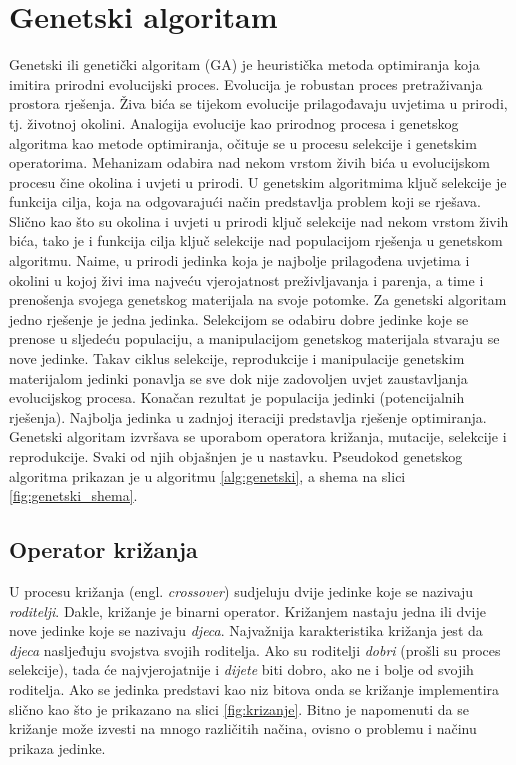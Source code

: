 \documentclass[times, utf8, zavrsni, numeric]{fer}
\begin{document}
\section{Genetski algoritam}
\label{sec:genetski}
Genetski ili genetički algoritam (GA)  je heuristička metoda optimiranja koja imitira prirodni evolucijski proces. Evolucija je robustan proces pretraživanja prostora rješenja. Živa bića se tijekom evolucije prilagođavaju uvjetima u prirodi, tj. životnoj okolini. Analogija evolucije kao prirodnog procesa i genetskog algoritma kao metode optimiranja, očituje se u procesu selekcije i genetskim operatorima. Mehanizam odabira nad nekom vrstom živih bića u evolucijskom procesu čine okolina i uvjeti u prirodi. U genetskim algoritmima ključ selekcije je funkcija cilja, koja na odgovarajući način predstavlja problem koji se rješava. Slično kao što su okolina i uvjeti u prirodi ključ selekcije nad nekom vrstom živih bića, tako je i funkcija cilja ključ selekcije nad populacijom rješenja u genetskom algoritmu. Naime, u prirodi jedinka koja je najbolje prilagođena uvjetima i okolini u kojoj živi ima najveću vjerojatnost preživljavanja i parenja, a time i prenošenja svojega genetskog materijala na svoje potomke. Za genetski algoritam jedno rješenje je jedna jedinka. Selekcijom se odabiru dobre jedinke koje se prenose u sljedeću populaciju, a manipulacijom genetskog materijala stvaraju se nove jedinke. Takav ciklus selekcije, reprodukcije i manipulacije genetskim materijalom jedinki ponavlja se sve dok nije zadovoljen uvjet zaustavljanja evolucijskog procesa. Konačan rezultat je populacija jedinki (potencijalnih rješenja). Najbolja jedinka u zadnjoj iteraciji predstavlja rješenje optimiranja. Genetski algoritam izvršava se uporabom operatora križanja, mutacije, selekcije i reprodukcije. Svaki od njih objašnjen je u nastavku. Pseudokod genetskog algoritma prikazan je u algoritmu \ref{alg:genetski}, a shema na slici \ref{fig:genetski_shema}.

\subsection{Operator križanja}
U procesu križanja (engl. \emph{crossover}) sudjeluju dvije jedinke koje se nazivaju \emph{roditelji}. Dakle, križanje je binarni operator. Križanjem nastaju jedna ili dvije nove jedinke koje se nazivaju \emph{djeca}. Najvažnija karakteristika križanja jest da \emph{djeca} nasljeđuju svojstva svojih roditelja. Ako su roditelji \emph{dobri} (prošli su proces selekcije), tada će najvjerojatnije i \emph{dijete} biti dobro, ako ne i bolje od svojih roditelja. Ako se jedinka predstavi kao niz bitova onda se križanje implementira slično kao što je prikazano na slici \ref{fig:krizanje}. Bitno je napomenuti da se križanje može izvesti na mnogo različitih načina, ovisno o problemu i načinu prikaza jedinke.
\end{document}

